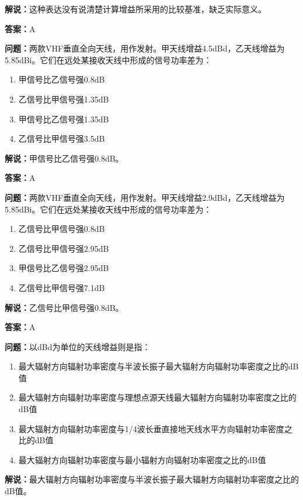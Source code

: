 \textbf{解说：}这种表达没有说清楚计算增益所采用的比较基准，缺乏实际意义。%

\textbf{答案：}A

\textbf{问题：}两款VHF垂直全向天线，用作发射。甲天线增益4.5dBd，乙天线增益为5.85dBi。它们在远处某接收天线中形成的信号功率差为：

\begin{enumerate}[label=\Alph*), leftmargin=3em]
	\item 甲信号比乙信号强0.8dB
	\item 乙信号比甲信号强1.35dB
	\item 甲信号比乙信号强1.35dB
	\item 乙信号比甲信号强3.5dB
\end{enumerate}

\textbf{解说：}甲信号比乙信号强0.8dB。%

\textbf{答案：}A

\textbf{问题：}两款VHF垂直全向天线，用作发射。甲天线增益2.9dBd，乙天线增益为5.85dBi。它们在远处某接收天线中形成的信号功率差为：

\begin{enumerate}[label=\Alph*), leftmargin=3em]
	\item 乙信号比甲信号强0.8dB
	\item 乙信号比甲信号强2.95dB
	\item 甲信号比乙信号强2.95dB
	\item 乙信号比甲信号强7.1dB
\end{enumerate}

\textbf{解说：}乙信号比甲信号强0.8dB。%

\textbf{答案：}A

\textbf{问题：}以dBd为单位的天线增益则是指：

\begin{enumerate}[label=\Alph*), leftmargin=3em]
	\item 最大辐射方向辐射功率密度与半波长振子最大辐射方向辐射功率密度之比的dB值
	\item 最大辐射方向辐射功率密度与理想点源天线最大辐射方向辐射功率密度之比的dB值
	\item 最大辐射方向辐射功率密度与1/4波长垂直接地天线水平方向辐射功率密度之比的dB值
	\item 最大辐射方向辐射功率密度与最小辐射方向辐射功率密度之比的dB值
\end{enumerate}

\textbf{解说：}最大辐射方向辐射功率密度与半波长振子最大辐射方向辐射功率密度之比的dB值。%

